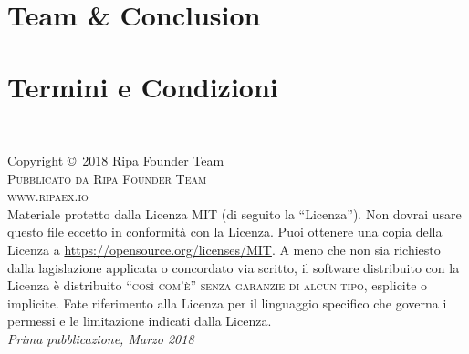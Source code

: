 \documentclass[11pt,fleqn,oneside]{book} %
\begin{document}


\chapter{Team \& Conclusion}




\chapter{Termini e Condizioni}



\nocite{*}
\printbibliography[title={Riferimenti}]



\newpage
~\vfill
\thispagestyle{empty}

\noindent Copyright \copyright\ 2018 Ripa Founder Team\\ %

\noindent \textsc{Pubblicato da Ripa Founder Team}\\ %

\noindent \textsc{www.ripaex.io}\\ %

\noindent Materiale protetto dalla Licenza MIT (di seguito la ``Licenza''). Non dovrai usare questo file eccetto in conformità con la Licenza. Puoi ottenere una copia della Licenza a \url{https://opensource.org/licenses/MIT}. A meno che non sia richiesto dalla lagislazione applicata o concordato via scritto, il software distribuito con la Licenza è distribuito \textsc{``così com'è'' senza garanzie di alcun tipo}, esplicite o implicite. Fate riferimento alla Licenza per il linguaggio specifico che governa i permessi e le limitazione indicati dalla Licenza.\\ 

\noindent \textit{Prima pubblicazione, Marzo 2018} %
\end{document}
